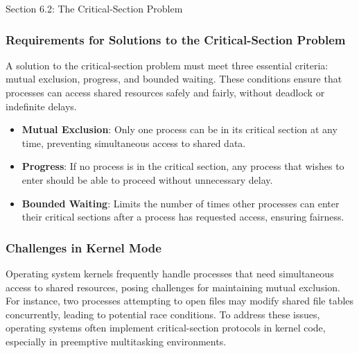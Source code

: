 \begin{notes}{Section 6.2: The Critical-Section Problem}
\begin{highlight}
    \end{highlight}
    
    \subsubsection*{Requirements for Solutions to the Critical-Section Problem}
    
    A solution to the critical-section problem must meet three essential criteria: mutual exclusion, progress, and bounded waiting. These conditions ensure that processes can access shared resources 
    safely and fairly, without deadlock or indefinite delays.
    
    \begin{highlight}
    
        \begin{itemize}
            \item \textbf{Mutual Exclusion}: Only one process can be in its critical section at any time, preventing simultaneous access to shared data.
            \item \textbf{Progress}: If no process is in the critical section, any process that wishes to enter should be able to proceed without unnecessary delay.
            \item \textbf{Bounded Waiting}: Limits the number of times other processes can enter their critical sections after a process has requested access, ensuring fairness.
        \end{itemize}
    
    \end{highlight}
    
    \subsubsection*{Challenges in Kernel Mode}
    
    Operating system kernels frequently handle processes that need simultaneous access to shared resources, posing challenges for maintaining mutual exclusion. For instance, two processes attempting 
    to open files may modify shared file tables concurrently, leading to potential race conditions. To address these issues, operating systems often implement critical-section protocols in kernel 
    code, especially in preemptive multitasking environments.
    
    \begin{highlight}
    

\end{highlight}
\end{notes}
